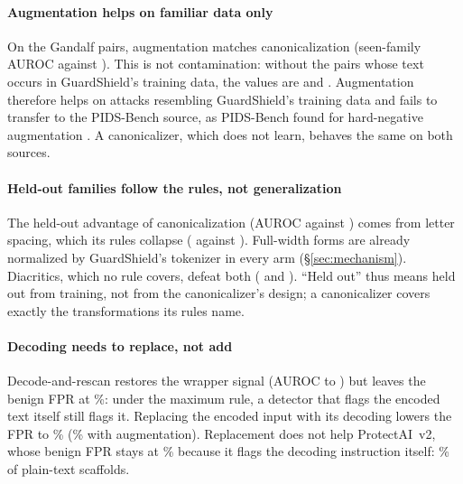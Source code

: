 \documentclass[conference]{IEEEtran}
\begin{document}
\paragraph{Augmentation helps on familiar data only} On the Gandalf pairs, augmentation matches canonicalization (seen-family AUROC \scObfAugmentSeenCharAuc{} against \scObfScriptAwareSeenCharAuc{}). This is not contamination: without the \scObfDeconExcluded{} pairs whose text occurs in GuardShield's training data, the values are \scObfDeconAugmentSeenCharAuc{} and \scObfDeconScriptAwareSeenCharAuc{}. Augmentation therefore helps on attacks resembling GuardShield's training data and fails to transfer to the PIDS-Bench source, as PIDS-Bench found for hard-negative augmentation \citep{pidsbench2026}. A canonicalizer, which does not learn, behaves the same on both sources.

\paragraph{Held-out families follow the rules, not generalization} The held-out advantage of canonicalization (AUROC \scPidsScriptAwareHeldOutAuc{} against \scPidsAugmentHeldOutAuc{}) comes from letter spacing, which its rules collapse (\scPidsScriptAwareSpacedLettersAuc{} against \scPidsAugmentSpacedLettersAuc{}). Full-width forms are already normalized by GuardShield's tokenizer in every arm (\S\ref{sec:mechanism}). Diacritics, which no rule covers, defeat both (\scPidsScriptAwareDiacriticsAuc{} and \scPidsAugmentDiacriticsAuc{}). ``Held out'' thus means held out from training, not from the canonicalizer's design; a canonicalizer covers exactly the transformations its rules name.

\paragraph{Decoding needs to replace, not add} Decode-and-rescan restores the wrapper signal (AUROC \scPidsNoneSeenWrapperAuc{} to \scPidsRescanOnlySeenWrapperAuc{}) but leaves the benign FPR at \scPidsRescanOnlySeenWrapperFpr\%: under the maximum rule, a detector that flags the encoded text itself still flags it. Replacing the encoded input with its decoding lowers the FPR to \scPidsScriptReplaceSeenWrapperFpr\% (\scPidsCanonAugmentReplaceSeenWrapperFpr\% with augmentation). Replacement does not help ProtectAI~v2, whose benign FPR stays at \scPidsProtectaiScriptReplaceSeenWrapperFpr\% because it flags the decoding instruction itself: \scPidsProtectaiNoneScaffoldFpr\% of plain-text scaffolds.
\end{document}
